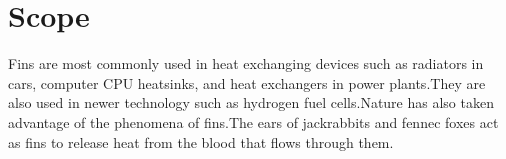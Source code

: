  \section{Scope}
 
 Fins are most commonly used in heat exchanging devices such as radiators in cars, computer CPU heatsinks, and heat exchangers in power plants.They are also used in newer technology such as hydrogen fuel cells.Nature has also taken advantage of the phenomena of fins.The ears of jackrabbits and fennec foxes act as fins to release heat from the blood that flows through them.













